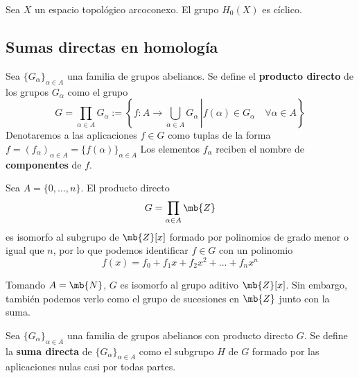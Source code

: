 \begin{proposition}
Sea $X$ un espacio topológico arcoconexo. El grupo $H_0(X)$ es cíclico.
\end{proposition}

\subsection{Sumas directas en homología}
Sea $\{G_\alpha\}_{\alpha \in A}$ una familia de grupos abelianos. Se define el
\textbf{producto directo} de los grupos $G_\alpha$ como el grupo
\[G=
\prod_{\alpha \in A} G_\alpha:=
\left\{\left.f\colon A \to \bigcup_{\alpha \in A}G_\alpha\,\right|
f(\alpha) \in G_\alpha \quad \forall \alpha \in A\right\}\]
Denotaremos a las aplicaciones $f \in G$ como tuplas de la forma
$f=(f_\alpha)_{\alpha \in A}=\{f(\alpha)\}_{\alpha \in A}$ Los elementos
$f_\alpha$ reciben el nombre de \textbf{componentes} de $f$.

\begin{example}
Sea $A=\{0,\dots, n\}$. El producto directo
\[G=\prod_{\alpha \in A}\mb{Z}\]
es isomorfo al subgrupo de $\mb{Z}[x]$ formado por polinomios de grado menor
o igual que $n$, por lo que podemos identificar $f \in G$ con un polinomio
\[f(x)=f_0+f_1x+f_2x^2+\dots+f_nx^{n}\]

Tomando $A=\mb{N}$, $G$ es isomorfo al grupo aditivo $\mb{Z}[x]$. Sin embargo, también
podemos verlo como el grupo de sucesiones en $\mb{Z}$ junto con la suma.
\end{example}

\begin{defn}
Sea $\{G_\alpha\}_{\alpha \in A}$ una familia de grupos abelianos con producto
directo $G$. Se define la \textbf{suma directa} de $\{G_\alpha\}_{\alpha \in A}$
como el subgrupo $H$ de $G$ formado por las aplicaciones nulas casi por todas
partes.
\end{defn}


